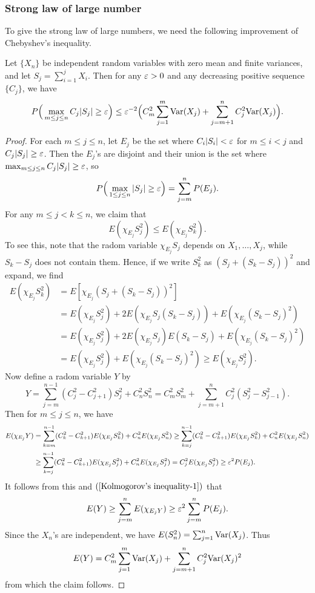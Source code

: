 \subsubsection{Strong law of large number}
To give the strong law of large numbers, we need the following improvement of Chebyshev's inequality.
\begin{proposition}
Let $\{X_n\}$ be independent random variables with zero mean and finite variances, and let $S_j=\sum_{i=1}^{j}X_i$. Then for any $\varepsilon>0$ and any decreasing positive sequence $\{C_j\}$, we have 
\[P\Big(\max_{m\leq j\leq n}C_j|S_j|\geq\varepsilon\Big)\leq\varepsilon^{-2}\Big(C_m^2\sum_{j=1}^{m}\mathrm{Var}(X_j)+\sum_{j=m+1}^{n}C_j^2\mathrm{Var}(X_j)\Big).\]
\end{proposition}
\begin{proof}
For each $m\leq j\leq n$, let $E_j$ be the set where $C_i|S_i|<\varepsilon$ for $m\leq i<j$ and $C_j|S_j|\geq\varepsilon$. Then the $E_j$'s are disjoint and their union is the set where $\max_{m\leq j\leq n}C_j|S_j|\geq\varepsilon$, so
\begin{align}\label{Kolmogorov's inequality-1}
P\Big(\max_{1\leq j\leq n}|S_j|\geq\varepsilon\Big)=\sum_{j=m}^{n}P(E_j).
\end{align}
For any $m\leq j<k\leq n$, we claim that
\[E(\chi_{E_j}S_j^2)\leq E(\chi_{E_j}S_k^2).\]
To see this, note that the radom variable $\chi_{E_j}S_j$ depends on $X_1,\dots,X_j$, while $S_k-S_j$ does not contain them. Hence, if we write $S_k^2$ as $(S_j+(S_k-S_j))^2$ and expand, we find
\begin{align*}
E(\chi_{E_j}S_k^2)&=E[\chi_{E_j}(S_j+(S_k-S_j))^2]\\
&=E(\chi_{E_j}S_j^2)+2E(\chi_{E_j}S_j(S_k-S_j))+E(\chi_{E_j}(S_k-S_j)^2)\\
&=E(\chi_{E_j}S_j^2)+2E(\chi_{E_j}S_j)E(S_k-S_j)+E(\chi_{E_j}(S_k-S_j)^2)\\
&=E(\chi_{E_j}S_j^2)+E(\chi_{E_j}(S_k-S_j)^2)\geq E(\chi_{E_j}S_j^2).
\end{align*}
Now define a radom variable $Y$ by
\[Y=\sum_{j=m}^{n-1}(C_j^2-C_{j+1}^2)S_j^2+C_n^2S_n^2=C_m^2S_m^2+\sum_{j=m+1}^{n}C_j^2(S_j^2-S_{j-1}^2).\]
Then for $m\leq j\leq n$, we have
\begin{equation*}\small
\begin{aligned}
E(\chi_{E_j}Y)&=\sum_{k=m}^{n-1}(C_k^2-C_{k+1}^2)E(\chi_{E_j}S_k^2)+C_n^2E(\chi_{E_j}S_n^2)\geq\sum_{k=j}^{n-1}(C_k^2-C_{k+1}^2)E(\chi_{E_j}S_k^2)+C_n^2E(\chi_{E_j}S_n^2)\\
&\geq\sum_{k=j}^{n-1}(C_k^2-C_{k+1}^2)E(\chi_{E_j}S_j^2)+C_n^2E(\chi_{E_j}S_j^2)=C_j^2E(\chi_{E_j}S_j^2)\geq\varepsilon^2P(E_j).
\end{aligned}
\end{equation*}
It follows from this and $(\ref{Kolmogorov's inequality-1})$ that
\[E(Y)\geq\sum_{j=m}^{n}E(\chi_{E_jY})\geq\varepsilon^2\sum_{j=m}^{n}P(E_j).\]
Since the $X_n$'s are independent, we have $E(S_n^2)=\sum_{j=1}^{n}\mathrm{Var}(X_j)$. Thus
\[E(Y)=C_m^2\sum_{j=1}^{m}\mathrm{Var}(X_j)+\sum_{j=m+1}^{n}C_j^2\mathrm{Var}(X_j)^2\]
from which the claim follows.
\end{proof}

